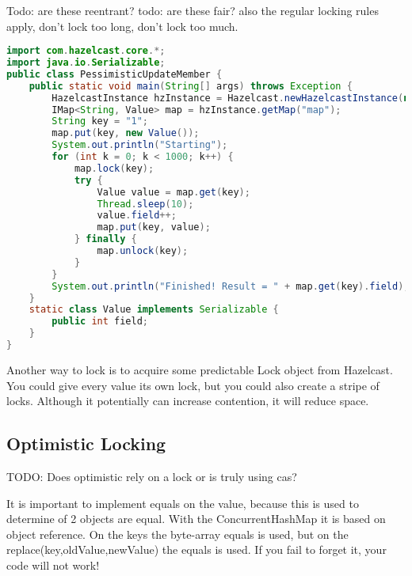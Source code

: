 Todo: are these reentrant?
todo: are these fair?
also the regular locking rules apply, don't lock too long, don't lock too much.

\begin{lstlisting}[language=java]
import com.hazelcast.core.*;
import java.io.Serializable;
public class PessimisticUpdateMember {
    public static void main(String[] args) throws Exception {
        HazelcastInstance hzInstance = Hazelcast.newHazelcastInstance(null);
        IMap<String, Value> map = hzInstance.getMap("map");
        String key = "1";
        map.put(key, new Value());
        System.out.println("Starting");
        for (int k = 0; k < 1000; k++) {
            map.lock(key);
            try {
                Value value = map.get(key);
                Thread.sleep(10);
                value.field++;
                map.put(key, value);
            } finally {
                map.unlock(key);
            }
        }
        System.out.println("Finished! Result = " + map.get(key).field);
    }
    static class Value implements Serializable {
        public int field;
    }
}
\end{lstlisting}

Another way to lock is to acquire some predictable Lock object from Hazelcast. You could give every value its own lock, but you could also create a stripe of locks. Although it potentially can increase contention, it will reduce space.

\subsection{Optimistic Locking}
TODO: Does optimistic rely on a lock or is truly using cas?

It is important to implement equals on the value, because this is used to determine of 2 objects are equal. With the ConcurrentHashMap it is based on object reference. On the keys the byte-array equals is used, but on the replace(key,oldValue,newValue) the equals is used. If you fail to forget it, your code will not work!

